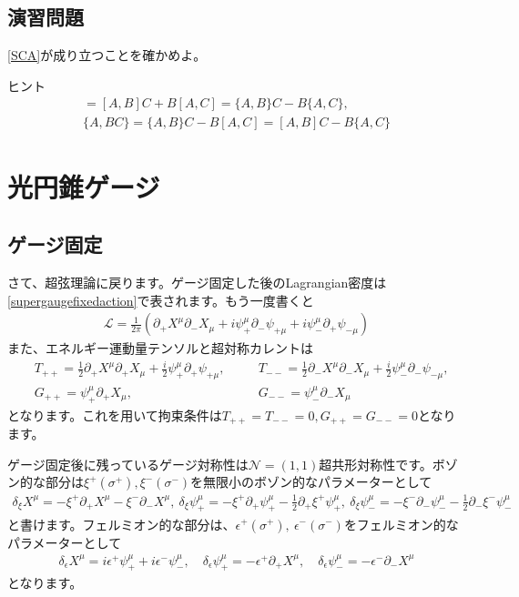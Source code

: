 \documentclass[report,paper=a4, fontsize=12pt, line_length=16cm, number_of_lines=34,dvipdfmx]{jlreq}
\numberwithin{equation}{chapter}
\numberwithin{equation}{section}
\newcommand{\Ncal}{\mathcal{N}}
\newcommand{\del}{\partial}
\newcommand{\Lcal}{\mathcal{L}}
\begin{document}
\subsection*{演習問題}
\eqref{SCA}が成り立つことを確かめよ。

ヒント
\begin{align}
  [A,BC]=[A,B]C+B[A,C]
   =\{A,B\}C-B\{A,C\},\\
  \{A,BC\}=\{A,B\}C-B[A,C]
  =[A,B]C-B\{A,C\}
\end{align}

\section{光円錐ゲージ}
\subsection{ゲージ固定}
さて、超弦理論に戻ります。ゲージ固定した後のLagrangian密度は\eqref{supergaugefixedaction}で表されます。もう一度書くと
\begin{align}
    \Lcal = \frac{1}{2\pi}\left( 
      \del_{+}X^{\mu}\del_{-}X_{\mu}+i\psi^{\mu}_{+}\del_{-}\psi_{+\mu}
      +i\psi^{\mu}_{-}\del_{+}\psi_{-\mu}
     \right)
     \label{supergaugefixedaction2}
\end{align}
また、エネルギー運動量テンソルと超対称カレントは
\begin{align}
  &T_{++}=\frac12\del_{+}X^{\mu}\del_{+}X_{\mu}+\frac{i}{2}\psi^{\mu}_{+}\del_{+}\psi_{+\mu},\quad &&
T_{--}=\frac12\del_{-}X^{\mu}\del_{-}X_{\mu}+\frac{i}{2}\psi^{\mu}_{-}\del_{-}\psi_{-\mu},\nonumber\\
&G_{++}=\psi^{\mu}_{+}\del_{+}X_{\mu},&&
G_{--}=\psi^{\mu}_{-}\del_{-}X_{\mu}
\end{align}    
となります。これを用いて拘束条件は$T_{++}=T_{--}=0,G_{++}=G_{--}=0$となります。

ゲージ固定後に残っているゲージ対称性は$\Ncal=(1,1)$超共形対称性です。ボゾン的な部分は$\xi^{+}(\sigma^{+}),\xi^{-}(\sigma^{-})$を無限小のボゾン的なパラメーターとして
\begin{align}
  \delta_{\xi}X^{\mu}=-\xi^{+}\del_{+}X^{\mu}-\xi^{-}\del_{-}X^{\mu},\ 
  \delta_{\xi}\psi^{\mu}_{+}=-\xi^{+}\del_{+}\psi^{\mu}_{+}-\frac12 \del_{+}\xi^{+}\psi^{\mu}_{+},\ 
  \delta_{\xi}\psi^{\mu}_{-}=-\xi^{-}\del_{-}\psi^{\mu}_{-}-\frac12 \del_{-}\xi^{-}\psi^{\mu}_{-}\label{superresifualtransformationbosonic2}
\end{align}    
と書けます。フェルミオン的な部分は、$\epsilon^{+}(\sigma^{+}),\ \epsilon^{-}(\sigma^{-})$をフェルミオン的なパラメーターとして
\begin{align}
  \delta_{\epsilon}X^{\mu}=i\epsilon^{+}\psi^{\mu}_{+}+i\epsilon^{-}\psi^{\mu}_{-}
  ,\quad
  \delta_{\epsilon}\psi^{\mu}_{+}=-\epsilon^{+}\del_{+}X^{\mu}
  ,\quad
  \delta_{\epsilon}\psi^{\mu}_{-}=-\epsilon^{-}\del_{-}X^{\mu}
  \label{superresidualtransformation2}
\end{align}    
となります。
\end{document}
